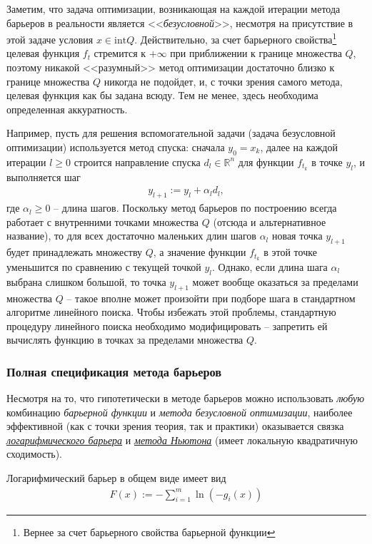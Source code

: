 \documentclass[%
	11pt,
	a4paper,
	utf8,
		]{article}
\begin{document}
Заметим, что задача оптимизации, возникающая на каждой итерации метода барьеров в реальности является <<\emph{безусловной}>>, несмотря на присутствие в этой задаче условия $ x \in \text{int} Q $. Действительно, за счет барьерного свойства\footnote{Вернее за счет барьерного свойства барьерной функции} целевая функция $ f_t $ стремится к $ + \infty $ при приближении к границе множества $ Q $, поэтому никакой <<разумный>> метод оптимизации достаточно близко к границе множества $ Q $ никогда не подойдет, и, с точки зрения самого метода, целевая функция как бы задана всюду. Тем не менее, здесь необходима определенная аккуратность.

Например, пусть для решения вспомогательной задачи (задача безусловной оптимизации) используется метод спуска: сначала $ y_0 = x_k $, далее на каждой итерации $ l \geqslant 0 $ строится направление спуска $ d_l \in \mathbb{R}^n $ для функции $ f_{t_k} $ в точке $ y_l $, и выполняется шаг
\begin{align*}
	y_{l + 1} := y_l + \alpha_l d_l,
\end{align*}
где $ \alpha_l \geqslant 0 $ -- длина шагов. Поскольку метод барьеров по построению всегда работает с внутренними точками множества $ Q $ (отсюда и альтернативное название), то для всех достаточно маленьких длин шагов $ \alpha_l $ новая точка $ y_{l+1} $ будет принадлежать множеству $ Q $, а значение функции $ f_{t_k} $ в этой точке уменьшится по сравнению с текущей точкой $ y_l $. Однако, если длина шага $ \alpha_l $ выбрана слишком большой, то точка $ y_{l+1} $ может вообще оказаться за пределами множества $ Q $ -- такое вполне может произойти при подборе шага в стандартном алгоритме линейного поиска. Чтобы избежать этой проблемы, стандартную процедуру линейного поиска необходимо модифицировать -- запретить ей вычислять функцию в точках за пределами множества $ Q $.

\subsubsection{Полная спецификация метода барьеров}

Несмотря на то, что гипотетически в методе барьеров можно использовать \emph{любую} комбинацию \emph{барьерной функции} и \emph{метода безусловной оптимизации}, наиболее эффективной (как с точки зрения теория, так и практики) оказывается связка \emph{\underline{логарифмического барьера}} и \emph{\underline{метода Ньютона}} (имеет локальную квадратичную сходимость).

Логарифмический барьер в общем виде имеет вид
\begin{align*}
	F(x) := - \sum_{i=1}^m \ln (- g_i(x))
\end{align*}
\end{document}
